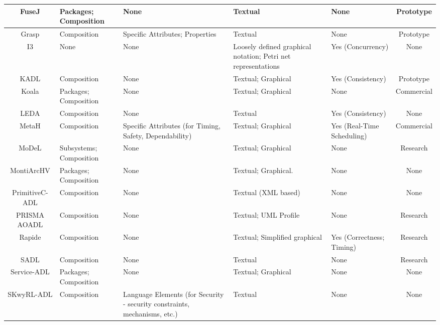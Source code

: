 \begin{landscape}
\begin{longtable}{|c|P{2cm}|P{3cm}|P{3cm}|p{2cm}|c|}
FuseJ & Packages; Composition & None & Textual & None & Prototype \\ 
\hline

Grasp & Composition & Specific Attributes; Properties & Textual & None & Prototype \\ 
\hline

I3 & None & None & Loosely defined graphical notation; Petri net representations & Yes (Concurrency) & None \\ 
\hline

KADL & Composition & None & Textual; Graphical & Yes (Consistency) & Prototype \\ 
\hline

Koala & Packages; Composition & None & Textual; Graphical & None & Commercial \\ 
\hline

LEDA & Composition & None & Textual & Yes (Consistency) & None \\ 
\hline

MetaH & Composition & Specific Attributes (for Timing, Safety, Dependability) & Textual; Graphical & Yes (Real-Time Scheduling) & Commercial \\ 
\hline

MoDeL & Subsystems; Composition & None & Textual; Graphical & None & Research \\ 
\hline

MontiArcHV & Packages; Composition & None & Textual; Graphical. & None & None \\ 
\hline

PrimitiveC-ADL & Composition & None & Textual (XML based) & None & None \\ 
\hline

PRISMA AOADL & Composition & None & Textual; UML Profile & None & Research \\ 
\hline

Rapide & Composition & None & Textual; Simplified graphical & Yes (Correctness; Timing) & Research \\ 
\hline

SADL & Composition & None & Textual & None & Research \\ 
\hline

Service-ADL & Packages; Composition & None & Textual; Graphical & None & None \\ 
\hline

SKwyRL-ADL & Composition & Language Elements (for Security - security constraints, mechanisms, etc.) & Textual & None & None \\ 
\hline


\end{longtable}
\end{landscape}
